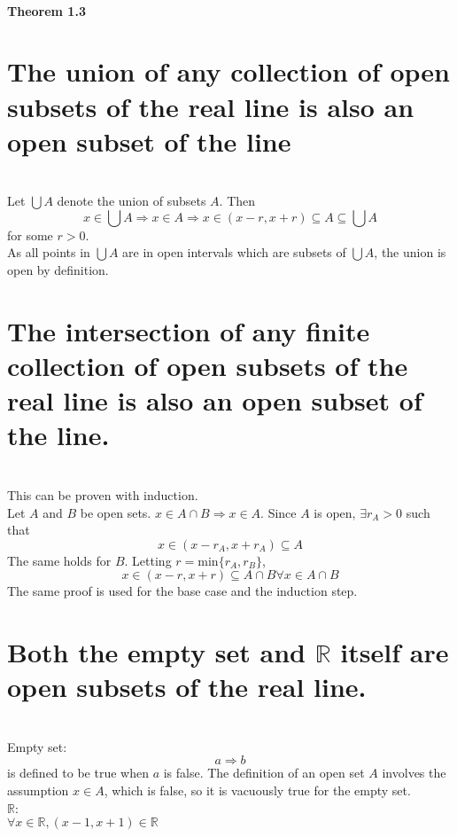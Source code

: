 \subsection{Theorem 1.3}

\question

\begin{parts}
 
 \part{The union of any collection of open subsets of the real line is also an open subset of the line}
 
 
\begin{solution}
 \\ Let $\bigcup A$ denote the union of subsets $A$. Then
$$x \in \bigcup A \Rightarrow x \in A \Rightarrow x \in (x-r,x+r) \subseteq A \subseteq \bigcup A$$
for some $r > 0$. \\
As all points in $\bigcup A$ are in open intervals which are subsets of $\bigcup A$, the union is open by definition.
\end{solution}

\part{The intersection of any finite collection of open subsets of the real line is also an open subset of the line.}

\begin{solution}
 \\This can be proven with induction. \\
Let $A$ and $B$ be open sets. $x \in A \cap B \Rightarrow x \in A$. Since $A$ is open, $\exists r_A > 0$ such that
$$x \in (x-r_A,x+r_A) \subseteq A$$
The same holds for $B$. Letting $r = \text{min}\{r_A,r_B\}$,
$$x \in (x-r,x+r) \subseteq A \cap B \forall x \in A \cap B$$
The same proof is used for the base case and the induction step.
\end{solution}

\part{Both the empty set and $\mathbb{R}$ itself are open subsets of the real line.}

\begin{solution}
 \\Empty set: \\
 $$a \Rightarrow b$$
 is defined to be true when $a$ is false. The definition of an open set $A$ involves the assumption $x \in A$, which is false, so it is vacuously true for the empty set. \\
 $\mathbb{R}$: \\
 $\forall x \in \mathbb{R}, (x-1,x+1) \in \mathbb{R}$
\end{solution}

\end{parts}


